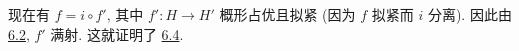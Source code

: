 现在有 \(f=i\circ f'\),
其中 \(f':H\to H'\) 概形占优且拟紧 (因为 \(f\) 拟紧而 \(i\) 分离).
因此由 \hyperref[cor:sga3-VIA-6.2]{6.2}, \(f'\) 满射.
这就证明了 \hyperref[prop:sga3-VIA-6.4]{6.4}.
